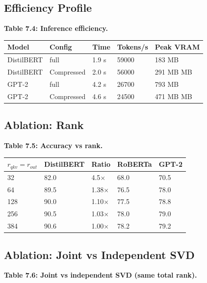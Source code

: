 \subsection{Efficiency Profile}

\textbf{Table 7.4: Inference efficiency.}

\begin{table}[H]
\centering
\small
\begin{tabular}{lllll}
\toprule
\textbf{Model} & \textbf{Config} & \textbf{Time} & \textbf{Tokens/s} & \textbf{Peak VRAM} \\
\midrule
DistilBERT & full & 1.9 s & 59000 & 183 MB \\
DistilBERT & Compressed & 2.0 s & 56000 & 291 MB MB \\
GPT-2 & full & 4.2 s & 26700 & 793 MB \\
GPT-2 & Compressed & 4.6 s & 24500 & 471 MB MB \\
\bottomrule
\end{tabular}
\end{table}

\subsection{Ablation: Rank}

\textbf{Table 7.5: Accuracy vs rank.}

\begin{table}[H]
\centering
\small
\begin{tabular}{lllll}
\toprule
\textbf{$r_{qkv} = r_{out}$} & \textbf{DistilBERT} & \textbf{Ratio} & \textbf{RoBERTa} & \textbf{GPT-2} \\
\midrule
32 & 82.0 & 4.5$\times$ & 68.0 & 70.5 \\
64 & 89.5 & 1.38$\times$ & 76.5 & 78.0 \\
128 & 90.0 & 1.10$\times$ & 77.5 & 78.8 \\
256 & 90.5 & 1.03$\times$ & 78.0 & 79.0 \\
384 & 90.6 & 1.00$\times$ & 78.2 & 79.2 \\
\bottomrule
\end{tabular}
\end{table}

\subsection{Ablation: Joint vs Independent SVD}

\textbf{Table 7.6: Joint vs independent SVD (same total rank).}

